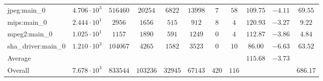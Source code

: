 \begin{tabular}{|l|c|c|c|c|c|c|c|c|c|c|}
jpeg:main\_0            & $ 4.706 \cdot 10^{3} $ & $ 516460 $ & $ 20254  $ & $ 6822  $ & $ 13998 $ & $ 7   $ & $ 58  $ & $ 109.75      $ & $ -4.11   $ & $ 69.55   $ \\
mips:main\_0            & $ 2.444 \cdot 10^{1} $ & $ 2956   $ & $ 1656   $ & $ 515   $ & $ 912   $ & $ 8   $ & $ 4   $ & $ 120.93      $ & $ -3.27   $ & $ 9.22    $ \\
mpeg2:main\_0           & $ 1.025 \cdot 10^{1} $ & $ 1157   $ & $ 1890   $ & $ 591   $ & $ 1249  $ & $ 0   $ & $ 4   $ & $ 112.87      $ & $ -3.86   $ & $ 4.84    $ \\
sha\_driver:main\_0     & $ 1.210 \cdot 10^{3} $ & $ 104067 $ & $ 4265   $ & $ 1582  $ & $ 3523  $ & $ 0   $ & $ 10  $ & $ 86.00       $ & $ -6.63   $ & $ 63.52   $ \\
\hline
Average                 & $                    $ & $        $ & $        $ & $       $ & $       $ & $     $ & $     $ & $ 115.68      $ & $ -3.73   $ & $         $ \\
\hline
Overall                 & $ 7.678 \cdot 10^{3} $ & $ 833544 $ & $ 103236 $ & $ 32945 $ & $ 67143 $ & $ 420 $ & $ 116 $ & $             $ & $         $ & $ 686.17  $ \\
\hline
\end{tabular}
